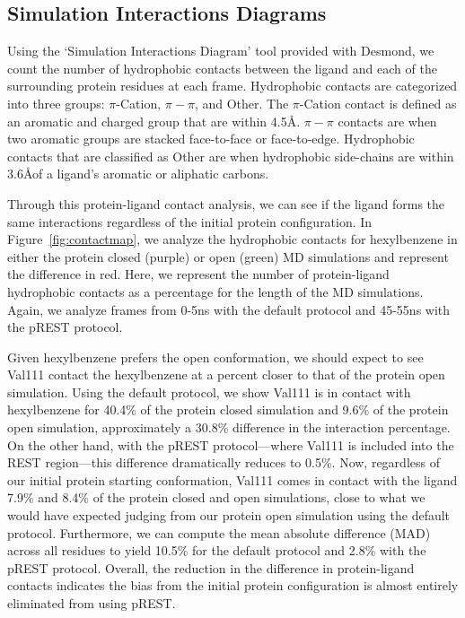 \documentclass[journal=jctcce,manuscript=article]{achemso}
\begin{document}


\begin{suppinfo}

\section*{Simulation Interactions Diagrams}
Using the `Simulation Interactions Diagram' tool provided with Desmond, we count the number of hydrophobic contacts between the ligand and each of the surrounding protein residues at each frame.
Hydrophobic contacts are categorized into three groups: $\pi$-Cation, $\pi-\pi$, and Other.
The $\pi$-Cation contact is defined as an aromatic and charged group that are within 4.5\AA.
$\pi-\pi$ contacts are when two aromatic groups are stacked face-to-face or face-to-edge.
Hydrophobic contacts that are classified as Other are when hydrophobic side-chains are within 3.6\AA of a ligand's aromatic or aliphatic carbons.

Through this protein-ligand contact analysis, we can see if the ligand forms the same interactions regardless of the initial protein configuration.
In Figure~\ref{fig:contactmap}, we analyze the hydrophobic contacts for hexylbenzene in either the protein closed (purple) or open (green) MD simulations and represent the difference in red.
Here, we represent the number of protein-ligand hydrophobic contacts as a percentage for the length of the MD simulations.
Again, we analyze frames from 0-5ns with the default protocol and 45-55ns with the pREST protocol.

Given hexylbenzene prefers the open conformation, we should expect to see Val111 contact the hexylbenzene at a percent closer to that of the protein open simulation.
Using the default protocol, we show Val111 is in contact with hexylbenzene for 40.4\% of the protein closed simulation and 9.6\% of the protein open simulation, approximately a 30.8\% difference in the interaction percentage.
On the other hand, with the pREST protocol---where Val111 is included into the REST region---this difference dramatically reduces to 0.5\%.
Now, regardless of our initial protein starting conformation, Val111 comes in contact with the ligand 7.9\% and 8.4\% of the protein closed and open simulations, close to what we would have expected judging from our protein open simulation using the default protocol.
Furthermore, we can compute the mean absolute difference (MAD) across all residues to yield 10.5\% for the default protocol and 2.8\% with the pREST protocol.
Overall, the reduction in the difference in protein-ligand contacts indicates the bias from the initial protein configuration is almost entirely eliminated from using pREST.


\end{suppinfo}
\end{document}
